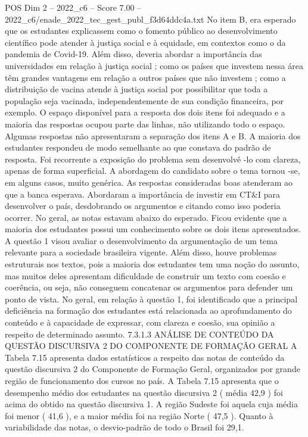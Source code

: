 \begin{textsample}{POS Dim 2 – 2022\_c6 – Score 7.00 – 2022\_c6/enade\_2022\_tec\_gest\_publ\_f3d64ddc4a.txt}
No item B, era esperado que os estudantes explicassem como o fomento público ao desenvolvimento científico pode atender à justiça social e à equidade, em contextos como o da pandemia de Covid-19.
Além disso, deveria abordar a importância das universidades em relação à justiça social ; como os países que investem nessa área têm grandes vantagens em relação a outros países que não investem ; como a distribuição de vacina atende à justiça social por possibilitar que toda a população seja vacinada, independentemente de sua condição financeira, por exemplo.
O espaço disponível para a resposta dos dois itens foi adequado e a maioria das respostas ocupou parte das linhas, não utilizando todo o espaço.
Algumas respostas não apresentaram a separação dos itens A e B.
A maioria dos estudantes respondeu de modo semelhante ao que constava do padrão de resposta.
Foi recorrente a exposição do problema sem desenvolvê -lo com clareza, apenas de forma superficial.
A abordagem do candidato sobre o tema tornou -se, em alguns casos, muito genérica.
As respostas consideradas boas atenderam ao que a banca esperava.
Abordaram a importância de investir em CT\&I para desenvolver o país, desdobrando os argumentos e citando como isso poderia ocorrer.
No geral, as notas estavam abaixo do esperado.
Ficou evidente que a maioria dos estudantes possui um conhecimento sobre os dois itens apresentados.
A questão 1 visou avaliar o desenvolvimento da argumentação de um tema relevante para a sociedade brasileira vigente.
Além disso, houve problemas estruturais nos textos, pois a maioria dos estudantes tem uma noção do assunto, mas muitos deles apresentam dificuldade de construir um texto com coesão e coerência, ou seja, não conseguem concatenar os argumentos para defender um ponto de vista.
No geral, em relação à questão 1, foi identificado que a principal deficiência na formação dos estudantes está relacionada ao aprofundamento do conteúdo e à capacidade de expressar, com clareza e coesão, sua opinião a respeito de determinado assunto. 7.3.1.3 ANÁLISE DE CONTEÚDO DA QUESTÃO DISCURSIVA 2 DO COMPONENTE DE FORMAÇÃO GERAL A Tabela 7.15 apresenta dados estatísticos a respeito das notas de conteúdo da questão discursiva 2 do Componente de Formação Geral, organizados por grande região de funcionamento dos cursos no país.
A Tabela 7.15 apresenta que o desempenho médio dos estudantes na questão discursiva 2 ( média 42,9 ) foi acima do obtido na questão discursiva 1.
A região Sudeste foi aquela cuja média foi menor ( 41,6 ), e a maior média foi na região Norte ( 47,5 ).
Quanto à variabilidade das notas, o desvio-padrão de todo o Brasil foi 29,1.

\end{textsample}
